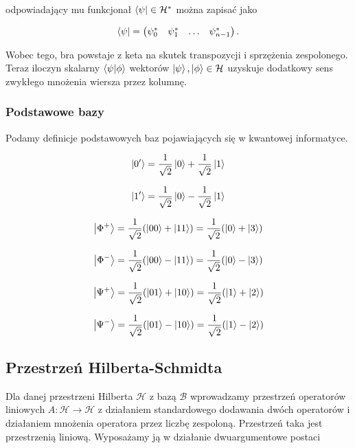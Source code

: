 odpowiadający mu funkcjonał $\bra{\psi} \in \mathcal{H}^{*}$ można zapisać jako 

$$
    \bra{\psi} = \begin{pmatrix} \psi_{0}^{*} & \psi_{1}^{*} & \ldots & \psi_{n - 1}^{*} \end{pmatrix}.
$$

Wobec tego, bra powstaje z keta na skutek transpozycji i sprzężenia zespolonego. Teraz iloczyn skalarny $\bra{\psi}\ket{\phi}$ wektorów $\ket{\psi}, \ket{\phi} \in \mathcal{H}$ uzyskuje dodatkowy sens zwykłego mnożenia wiersza przez kolumnę.

\subsubsection{Podstawowe bazy}

Podamy definicje podstawowych baz pojawiających się w kwantowej informatyce.

\begin{definition}
    $$
        \ket{0'} = \frac{1}{\sqrt{2}} \ket{0} + \frac{1}{\sqrt{2}} \ket{1}
    $$

    $$
        \ket{1'} = \frac{1}{\sqrt{2}} \ket{0} - \frac{1}{\sqrt{2}} \ket{1}
    $$
\end{definition}

\begin{definition}
    $$
        \ket{\Phi ^ {+}} = \frac{1}{\sqrt{2}} (\ket{00} + \ket{11}) = \frac{1}{\sqrt{2}} (\ket{0} + \ket{3})
    $$

    $$
        \ket{\Phi ^ {-}} = \frac{1}{\sqrt{2}} (\ket{00} - \ket{11}) = \frac{1}{\sqrt{2}} (\ket{0} - \ket{3})
    $$

    $$
        \ket{\Psi ^ {+}} = \frac{1}{\sqrt{2}} (\ket{01} + \ket{10}) = \frac{1}{\sqrt{2}} (\ket{1} + \ket{2})
    $$

    $$
        \ket{\Psi ^ {-}} = \frac{1}{\sqrt{2}} (\ket{01} - \ket{10}) = \frac{1}{\sqrt{2}} (\ket{1} - \ket{2})
    $$
\end{definition}

\subsection{Przestrzeń Hilberta-Schmidta}

Dla danej przestrzeni Hilberta $\mathcal{H}$ z bazą $\mathcal{B}$ wprowadzamy przestrzeń operatorów liniowych $A: \mathcal{H} \rightarrow \mathcal{H}$ z działaniem standardowego dodawania dwóch operatorów i działaniem mnożenia operatora przez liczbę zespoloną. Przestrzeń taka jest przestrzenią liniową. Wyposażamy ją w działanie dwuargumentowe postaci

